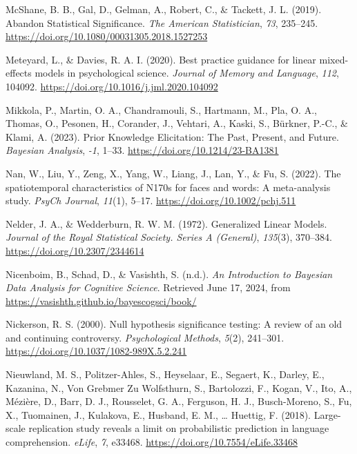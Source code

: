 \documentclass[
  doc,12pt,floatsintext]{apa7}
\newlength{\cslhangindent}
\newenvironment{CSLReferences}[2] %
 {\begin{list}{}{%
  \setlength{\itemindent}{0pt}
  \setlength{\leftmargin}{0pt}
  \setlength{\parsep}{0pt}
  \ifodd #1
   \setlength{\leftmargin}{\cslhangindent}
   \setlength{\itemindent}{-1\cslhangindent}
  \fi
  \setlength{\itemsep}{#2\baselineskip}}}
 {\end{list}}
\begin{document}
\begin{CSLReferences}{1}{0}
McShane, B. B., Gal, D., Gelman, A., Robert, C., \& Tackett, J. L. (2019). Abandon {Statistical Significance}. \emph{The American Statistician}, \emph{73}, 235--245. \url{https://doi.org/10.1080/00031305.2018.1527253}

Meteyard, L., \& Davies, R. A. I. (2020). Best practice guidance for linear mixed-effects models in psychological science. \emph{Journal of Memory and Language}, \emph{112}, 104092. \url{https://doi.org/10.1016/j.jml.2020.104092}

Mikkola, P., Martin, O. A., Chandramouli, S., Hartmann, M., Pla, O. A., Thomas, O., Pesonen, H., Corander, J., Vehtari, A., Kaski, S., Bürkner, P.-C., \& Klami, A. (2023). Prior {Knowledge Elicitation}: {The Past}, {Present}, and {Future}. \emph{Bayesian Analysis}, \emph{-1}, 1--33. \url{https://doi.org/10.1214/23-BA1381}

Nan, W., Liu, Y., Zeng, X., Yang, W., Liang, J., Lan, Y., \& Fu, S. (2022). The spatiotemporal characteristics of {N170s} for faces and words: {A} meta-analysis study. \emph{PsyCh Journal}, \emph{11}(1), 5--17. \url{https://doi.org/10.1002/pchj.511}

Nelder, J. A., \& Wedderburn, R. W. M. (1972). Generalized {Linear Models}. \emph{Journal of the Royal Statistical Society. Series A (General)}, \emph{135}(3), 370--384. \url{https://doi.org/10.2307/2344614}

Nicenboim, B., Schad, D., \& Vasishth, S. (n.d.). \emph{An {Introduction} to {Bayesian Data Analysis} for {Cognitive Science}}. Retrieved June 17, 2024, from \url{https://vasishth.github.io/bayescogsci/book/}

Nickerson, R. S. (2000). Null hypothesis significance testing: {A} review of an old and continuing controversy. \emph{Psychological Methods}, \emph{5}(2), 241--301. \url{https://doi.org/10.1037/1082-989X.5.2.241}

Nieuwland, M. S., Politzer-Ahles, S., Heyselaar, E., Segaert, K., Darley, E., Kazanina, N., Von Grebmer Zu Wolfsthurn, S., Bartolozzi, F., Kogan, V., Ito, A., Mézière, D., Barr, D. J., Rousselet, G. A., Ferguson, H. J., Busch-Moreno, S., Fu, X., Tuomainen, J., Kulakova, E., Husband, E. M., \ldots{} Huettig, F. (2018). Large-scale replication study reveals a limit on probabilistic prediction in language comprehension. \emph{eLife}, \emph{7}, e33468. \url{https://doi.org/10.7554/eLife.33468}


\end{CSLReferences}
\end{document}
